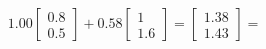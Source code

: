 \documentclass[preview]{standalone}
\begin{document}
\begin{align*}
1.00 \begin{bmatrix} 0.8 \\ 0.5 \end{bmatrix} + 0.58 \begin{bmatrix} 1 \\ 1.6 \end{bmatrix} = \begin{bmatrix} 1.38 \\ 1.43 \end{bmatrix} =
\end{align*}
\end{document}
